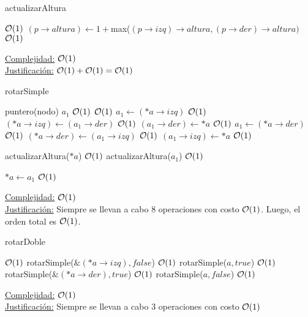 \begin{Algoritmos}

\begin{algorithm}
\caption{actualizarAltura}
\begin{algorithmic}[1]
	\Comment $\mathcal{O}(1)$
    \State $(p\to altura)\gets 1 + $max($(p\to izq)\to altura, (p\to der)\to altura)$
    \Comment $\mathcal{O}(1)$
  \EndIf
\EndProcedure
\end{algorithmic}
\underline{Complejidad:} $\mathcal{O}(1)$ \\
\underline{Justificación:} $\mathcal{O}(1) + \mathcal{O}(1) = \mathcal{O}(1)$
\end{algorithm}

\begin{algorithm}
\caption{rotarSimple}
\begin{algorithmic}[1]
	\State puntero(nodo) $a_1$
	\Comment $\mathcal{O}(1)$
  \Comment $\mathcal{O}(1)$
    \State $a_1 \gets (*a\to izq)$
    \Comment $\mathcal{O}(1)$
    \State $(*a\to izq) \gets (a_1\to der)$
    \Comment $\mathcal{O}(1)$
    \State $(a_1\to der)\gets *a$
    \Comment $\mathcal{O}(1)$
  \Else
    \State $a_1 \gets (*a\to der)$
    \Comment $\mathcal{O}(1)$
    \State $(*a\to der) \gets (a_1\to izq)$
    \Comment $\mathcal{O}(1)$
    \State $(a_1\to izq)\gets *a$
    \Comment $\mathcal{O}(1)$
  \EndIf

  \State actualizarAltura($*a$)
  \Comment $\mathcal{O}(1)$
  \State actualizarAltura($a_1$)
  \Comment $\mathcal{O}(1)$
  
  \State $*a \gets a_1$
  \Comment $\mathcal{O}(1)$
\EndProcedure
\end{algorithmic}
\underline{Complejidad:} $\mathcal{O}(1)$ \\
\underline{Justificación:} Siempre se llevan a cabo 8 operaciones con costo $\mathcal{O}(1)$. Luego, el orden total es $\mathcal{O}(1)$.
\end{algorithm}

\begin{algorithm}
\caption{rotarDoble}
\begin{algorithmic}[1]
	\Comment $\mathcal{O}(1)$
    \State rotarSimple($\&(*a\to izq), false$)
    \Comment $\mathcal{O}(1)$
    \State rotarSimple($a, true$)
    \Comment $\mathcal{O}(1)$
  \Else
		\State rotarSimple($\&(*a\to der), true$)
		\Comment $\mathcal{O}(1)$
    \State rotarSimple($a, false$)
    \Comment $\mathcal{O}(1)$
  \EndIf
\EndProcedure
\end{algorithmic}
\underline{Complejidad:} $\mathcal{O}(1)$ \\
\underline{Justificación:} Siempre se llevan a cabo 3 operaciones con costo $\mathcal{O}(1)$
\end{algorithm}


\end{Algoritmos}

